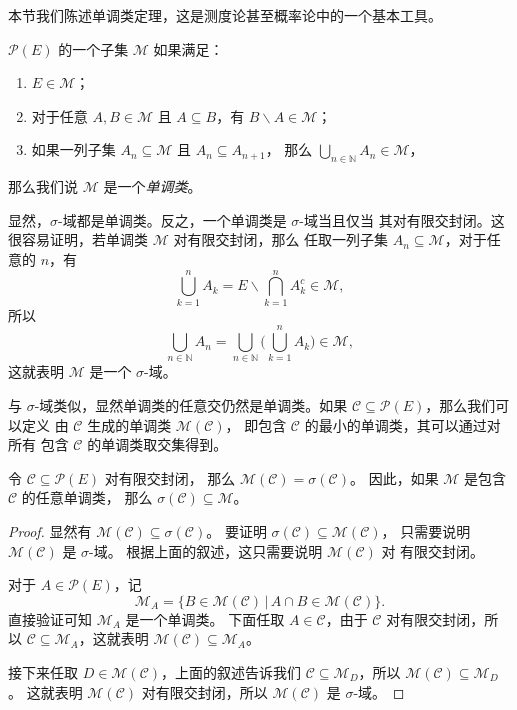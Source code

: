 \documentclass[fontset=none]{Notes}
\begin{document}
本节我们陈述单调类定理，这是测度论甚至概率论中的一个基本工具。

\begin{definition}
  $\mathcal{P}(E)$ 的一个子集 $\mathcal{M}$ 如果满足：
  \begin{enumerate}
    \item $E\in \mathcal{M}$；
    \item 对于任意 $A,B\in \mathcal{M}$ 且 $A\subseteq B$，有
    $B \smallsetminus A\in \mathcal{M}$；
    \item 如果一列子集 $A_n\subseteq \mathcal{M}$ 且 $A_n\subseteq A_{n+1}$，
    那么 $\bigcup_{n\in \mathbb{N}}A_n\in \mathcal{M}$，
  \end{enumerate}
  那么我们说 $\mathcal{M}$ 是一个\emph{单调类}。
\end{definition}

显然，$\sigma$-域都是单调类。反之，一个单调类是 $\sigma$-域当且仅当
其对有限交封闭。这很容易证明，若单调类 $\mathcal{M}$ 对有限交封闭，那么
任取一列子集 $A_n\subseteq \mathcal{M}$，对于任意的 $n$，有 
\[
  \bigcup_{k=1}^n  A_k=E \smallsetminus\bigcap_{k=1}^n A_k^c\in \mathcal{M},
\]
所以
\[
  \bigcup_{n\in \mathbb{N}}A_n=\bigcup_{n\in \mathbb{N}}
  \biggl(\bigcup_{k=1}^n A_k\biggr)  \in \mathcal{M},
\]
这就表明 $\mathcal{M}$ 是一个 $\sigma$-域。

与 $\sigma$-域类似，显然单调类的任意交仍然是单调类。如果
$\mathcal{C}\subseteq \mathcal{P}(E)$，那么我们可以定义
由 $\mathcal{C}$ 生成的单调类 $\mathcal{M}(\mathcal{C})$，
即包含 $\mathcal{C}$ 的最小的单调类，其可以通过对所有
包含 $\mathcal{C}$ 的单调类取交集得到。

\begin{theorem}[单调类定理]
  令 $\mathcal{C}\subseteq \mathcal{P}(E)$ 对有限交封闭，
  那么 $\mathcal{M}(\mathcal{C})=\sigma(\mathcal{C})$。
  因此，如果 $\mathcal{M}$ 是包含 $\mathcal{C}$ 的任意单调类，
  那么 $\sigma(\mathcal{C})\subseteq \mathcal{M}$。
\end{theorem}
\begin{proof}
  显然有 $\mathcal{M}(\mathcal{C})\subseteq \sigma(\mathcal{C})$。
  要证明 $\sigma(\mathcal{C})\subseteq \mathcal{M}(\mathcal{C})$，
  只需要说明 $\mathcal{M}(\mathcal{C})$ 是 $\sigma$-域。
  根据上面的叙述，这只需要说明 $\mathcal{M}(\mathcal{C})$ 对
  有限交封闭。

  对于 $A\in \mathcal{P}{(E)}$，记
  \[
    \mathcal{M}_A=\{B\in \mathcal{M}(\mathcal{C})\,|\,
    A\cap B\in \mathcal{M}(\mathcal{C})\}.  
  \]
  直接验证可知 $\mathcal{M}_A$ 是一个单调类。
  下面任取 $A\in \mathcal{C}$，由于 $\mathcal{C}$
  对有限交封闭，所以 $\mathcal{C}\subseteq \mathcal{M}_A$，这就表明
  $\mathcal{M}(\mathcal{C})\subseteq \mathcal{M}_A$。

  接下来任取 $D\in \mathcal{M}(\mathcal{C})$，上面的叙述告诉我们
  $\mathcal{C}\subseteq \mathcal{M}_D$，所以 $\mathcal{M}(\mathcal{C})\subseteq \mathcal{M}_D$。
  这就表明 $\mathcal{M}(\mathcal{C})$ 对有限交封闭，所以
  $\mathcal{M}(\mathcal{C})$ 是 $\sigma$-域。
\end{proof}
\end{document}
